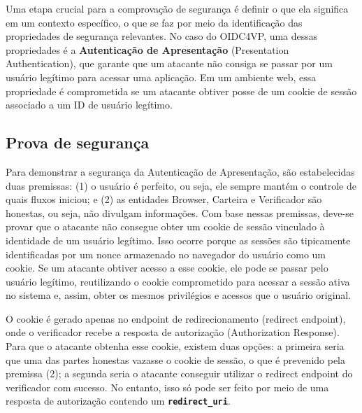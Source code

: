 Uma etapa crucial para a comprovação de segurança é definir o que ela significa em um contexto específico, o que se faz por meio da identificação das propriedades de segurança relevantes. No caso do \acs{OIDC4VP}, uma dessas propriedades é a \textbf{Autenticação de Apresentação} (Presentation Authentication), que garante que um atacante não consiga se passar por um usuário legítimo para acessar uma aplicação. Em um ambiente web, essa propriedade é comprometida se um atacante obtiver posse de um cookie de sessão associado a um ID de usuário legítimo.

\subsection{Prova de segurança}\label{subsection:proof-of-formal-analysis}


Para demonstrar a segurança da Autenticação de Apresentação, são estabelecidas duas premissas: (1) o usuário é perfeito, ou seja, ele sempre mantém o controle de quais fluxos iniciou; e (2) as entidades Browser, Carteira e Verificador são honestas, ou seja, não divulgam informações. Com base nessas premissas, deve-se provar que o atacante não consegue obter um cookie de sessão vinculado à identidade de um usuário legítimo. Isso ocorre porque as sessões são tipicamente identificadas por um nonce armazenado no navegador do usuário como um cookie. Se um atacante obtiver acesso a esse cookie, ele pode se passar pelo usuário legítimo, reutilizando o cookie comprometido para acessar a sessão ativa no sistema e, assim, obter os mesmos privilégios e acessos que o usuário original.

O cookie é gerado apenas no endpoint de redirecionamento (redirect endpoint), onde o verificador recebe a resposta de autorização (Authorization Response). Para que o atacante obtenha esse cookie, existem duas opções: a primeira seria que uma das partes honestas vazasse o cookie de sessão, o que é prevenido pela premissa (2); a segunda seria o atacante conseguir utilizar o redirect endpoint do verificador com sucesso. No entanto, isso só pode ser feito por meio de uma resposta de autorização contendo um \textbf{\texttt{redirect\_uri}}.


